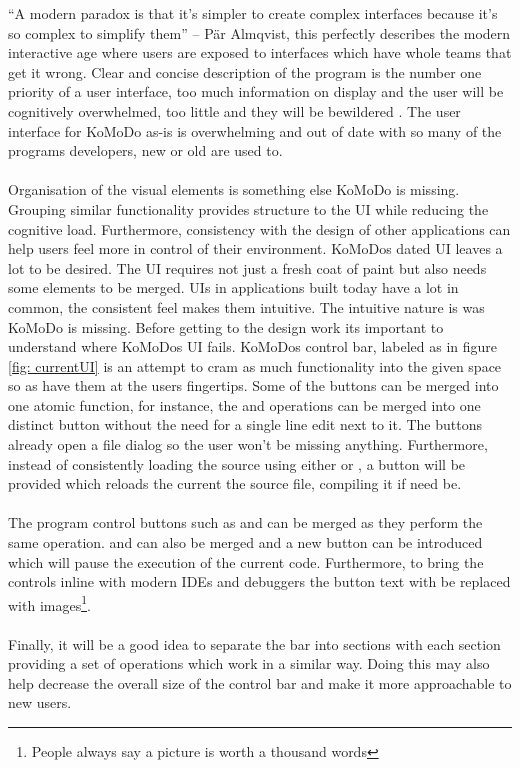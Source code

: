 \graphicspath{ {images/design/} }
``A modern paradox is that it’s simpler to create complex interfaces because it’s so complex to simplify them'' – P{\"a}r Almqvist, this perfectly describes the modern interactive age where users are exposed to interfaces which have whole teams that get it wrong. Clear and concise description of the program is the number one priority of a user interface, too much information on display and the user will be cognitively overwhelmed, too little and they will be bewildered \cite{design_principles}. The user interface for KoMoDo as-is is overwhelming and out of date with so many of the programs developers, new or old are used to.\\\\
%
Organisation of the visual elements is something else KoMoDo is missing. Grouping similar functionality provides structure to the UI while reducing the cognitive load. Furthermore, consistency with the design of other applications can help users feel more in control of their environment\cite{design_principles_two}.
KoMoDos dated UI leaves a lot to be desired. The UI requires not just a fresh coat of paint but also needs some elements to be merged. UIs in applications built today have a lot in common, the consistent feel makes them intuitive. The intuitive nature is was KoMoDo is missing. Before getting to the design work its important to understand where KoMoDos UI fails.
%
KoMoDos control bar, labeled as  in figure \ref{fig: currentUI} is an attempt to cram as much functionality into the given space so as have them at the users fingertips. Some of the buttons can be merged into one atomic function, for instance, the  and  operations can be merged into one distinct button without the need for a single line edit next to it. The buttons already open a file dialog so the user won't be missing anything. Furthermore, instead of consistently loading the source using either  or , a  button will be provided which reloads the current the source file, compiling it if need be.\\\\
%
The program control buttons such as  and  can be merged as they perform the same operation.  and  can also be merged and a new button  can be introduced which will pause the execution of the current code. Furthermore, to bring the controls inline with modern IDEs and debuggers the button text with be replaced with images\footnote{People always say a picture is worth a thousand words}.\\\\
%
Finally, it will be a good idea to separate the bar into sections with each section providing a set of operations which work in a similar way. Doing this may also help decrease the overall size of the control bar and make it more approachable to new users.

